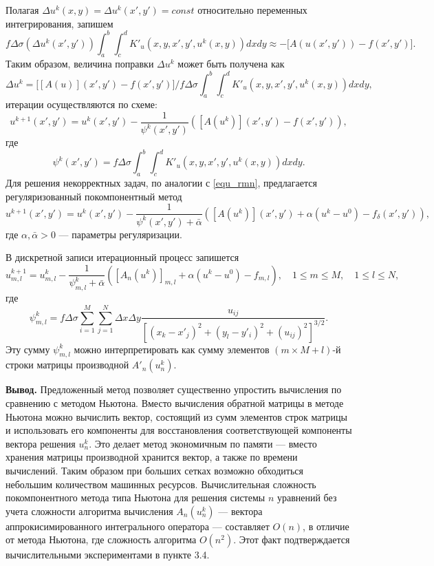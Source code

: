 Полагая $\Delta u^k(x,y)=\Delta u^k(x',y')=const$ относительно переменных интегрирования, запишем
\begin{equation}\label{comp_newt_meth_step1}
f\Delta\sigma(\Delta u^k(x',y'))\int_{a}^{b}\int_{c}^{d}K'_u(x,y, x',y',u^k(x,y)) dxdy\approx -\big[A(u(x',y'))-f(x',y')\big] .
\end{equation}
Таким образом, величина поправки $\Delta u^k$ может быть получена как
$$\Delta u^k=\bigg[[A(u)](x',y')-f(x',y')\bigg]\bigg/f\Delta\sigma\int_{a}^{b}\int_{c}^{d}K'_u(x,y, x',y',u^k(x,y)) dxdy,$$ 
итерации осуществляются по схеме:
\begin{equation}\label{comp_newt_meth}
u^{k+1}(x',y')=u^k(x',y')-\frac{1}{\psi^k(x',y')}([A(u^k)](x',y')-f(x',y')),
\end{equation}
где $$\psi^k(x',y')=f\Delta\sigma\int_{a}^{b}\int_{c}^{d}K'_u(x,y, x',y',u^k(x,y)) dxdy.$$
Для решения некорректных задач, по аналогии с \eqref{equ_rmn}, предлагается регуляризованный покомпонентный метод
\begin{equation}\label{rcomp_newt_meth}
u^{k+1}(x',y')=u^k(x',y')-\frac{1}{\psi^k(x',y')+\bar\alpha}([A(u^k)](x',y') + \alpha(u^k-u^0)-f_\delta(x',y')),
\end{equation}
где $\alpha, \bar{\alpha} > 0$ --- параметры регуляризации.

В дискретной записи итерационный процесс запишется
$$u_{m,l}^{k+1}=u_{m,l}^k-\frac{1}{\psi_{m,l}^k+\bar\alpha}([A_n(u^k)]_{m,l} + \alpha(u^k-u^0) -f_{m,l}),\quad 1\le m \le M, \quad 1\le l \le N,$$
где $$\psi_{m,l}^k=f\Delta\sigma\sum\limits_{i=1}^{M}\sum\limits_{j=1}^{N}
\Delta x\Delta y\frac{u_{ij}}{[(x_k-x'_j)^2+(y_l-y'_i)^2+(u_{ij})^2]^{3/2}}.$$
Эту сумму $\psi_{m,l}^k$ можно интерпретировать как сумму элементов $(m\times M + l)$-й строки матрицы производной $A'_n(u_n^k)$.

{\bfseries\large Вывод.} Предложенный метод позволяет существенно упростить вычисления по сравнению с методом Ньютона. Вместо вычисления обратной матрицы в методе Ньютона можно вычислить вектор, состоящий из сумм элементов строк матрицы и использовать его компоненты для восстановления соответствующей компоненты вектора решения $u_n^k$. Это делает метод экономичным по памяти --- вместо хранения матрицы производной хранится вектор, а также по времени вычислений. Таким образом при больших сетках возможно обходиться небольшим количеством машинных ресурсов. Вычислительная сложность покомпонентного метода типа Ньютона для решения системы $n$ уравнений без учета сложности алгоритма вычисления $A_n(u_n^k)$ --- вектора аппрокисимированного интегрального оператора --- составляет $O(n)$, в отличие от метода Ньютона, где сложность алгоритма $O(n^2)$. Этот факт подтверждается вычислительными экспериментами в пункте 3.4.

